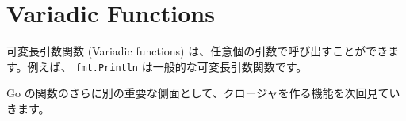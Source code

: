 \section{Variadic Functions}

可変長引数関数 (Variadic functions) は、任意個の引数で呼び出すことができます。例えば、 \texttt{fmt.Println} は一般的な可変長引数関数です。




Go の関数のさらに別の重要な側面として、クロージャを作る機能を次回見ていきます。